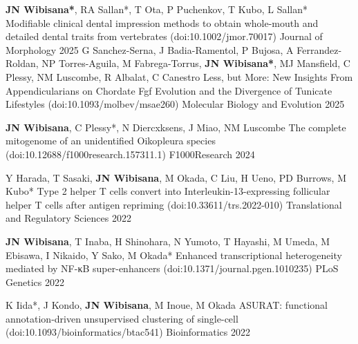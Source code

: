 



\begin{cventries}

  \cventrypub
    {\textbf{JN Wibisana*}, RA Sallan*, T Ota, P Puchenkov, T Kubo, L Sallan*} %
    {Modifiable clinical dental impression methods to obtain whole-mouth and detailed dental traits from vertebrates (doi:10.1002/jmor.70017)} %
    {Journal of Morphology} %
    {2025} %
  \cventrypub
    {G Sanchez-Serna, J Badia-Ramentol, P Bujosa, A Ferrandez-Roldan, NP Torres-Aguila, M Fabrega-Torrus, \textbf{JN Wibisana*}, MJ Mansfield, C Plessy, NM Luscombe, R Albalat, C Canestro} %
    {Less, but More: New Insights From Appendicularians on Chordate Fgf Evolution and the Divergence of Tunicate Lifestyles (doi:10.1093/molbev/msae260)} %
    {Molecular Biology and Evolution} %
    {2025} %

  \cventrypub
    {\textbf{JN Wibisana}, C Plessy*, N Diercxksens, J Miao, NM Luscombe} %
    {The complete mitogenome of an unidentified Oikopleura species (doi:10.12688/f1000research.157311.1)
    } %
    {F1000Research} %
    {2024} %

  \cventrypub
    {Y Harada, T Sasaki, \textbf{JN Wibisana}, M Okada, C Liu, H Ueno, PD Burrows, M Kubo*} %
    {Type 2 helper T cells convert into Interleukin-13-expressing follicular helper T cells after antigen repriming (doi:10.33611/trs.2022-010)} %
    {Translational and Regulatory Sciences} %
    {2022} %


  \cventrypub
    {\textbf{JN Wibisana}, T Inaba, H Shinohara, N Yumoto, T Hayashi, M Umeda, M Ebisawa, I Nikaido, Y Sako, M Okada*} %
    {Enhanced transcriptional heterogeneity mediated by NF-κB super-enhancers (doi:10.1371/journal.pgen.1010235)} %
    {PLoS Genetics} %
    {2022} %

  \cventrypublast
    {K Iida*, J Kondo, \textbf{JN Wibisana}, M Inoue, M Okada} %
    {ASURAT: functional annotation-driven unsupervised clustering of single-cell (doi:10.1093/bioinformatics/btac541)} %
    {Bioinformatics} %
    {2022} %


\end{cventries}


